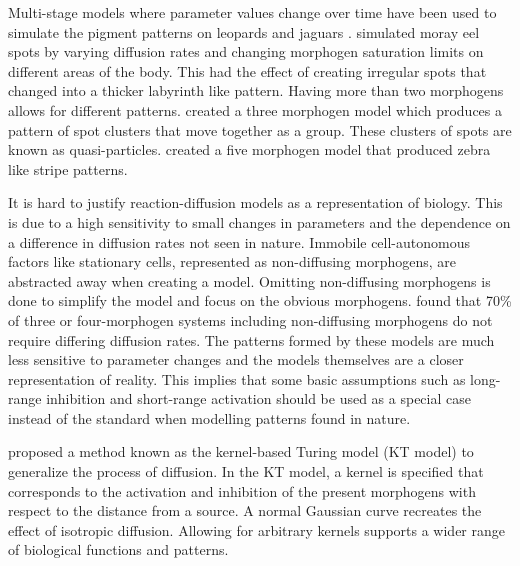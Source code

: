 Multi-stage models where parameter values change over time have been used to simulate the pigment patterns on leopards and jaguars \citep{liu2006}. \citet{malheiros2017} simulated moray eel spots by varying diffusion rates and changing morphogen saturation limits on different areas of the body. This had the effect of creating irregular spots that changed into a thicker labyrinth like pattern. Having more than two morphogens allows for different patterns. \citet{schenk2000} created a three morphogen model which produces a pattern of spot clusters that move together as a group. These clusters of spots are known as quasi-particles. \citet{meinhardt1982} created a five morphogen model that produced zebra like stripe patterns.

It is hard to justify reaction-diffusion models as a representation of biology. This is due to a high sensitivity to small changes in parameters and the dependence on a difference in diffusion rates not seen in nature. Immobile cell-autonomous factors like stationary cells, represented as non-diffusing morphogens, are abstracted away when creating a model. Omitting non-diffusing morphogens is done to simplify the model and focus on the obvious morphogens. \citet{marcon2016} found that 70\% of three or four-morphogen systems including non-diffusing morphogens do not require differing diffusion rates. The patterns formed by these models are much less sensitive to parameter changes and the models themselves are a closer representation of reality. This implies that some basic assumptions such as long-range inhibition and short-range activation should be used as a special case instead of the standard when modelling patterns found in nature.

\citet{kondo2017} proposed a method known as the kernel-based Turing model (KT model) to generalize the process of diffusion. In the KT model, a kernel is specified that corresponds to the activation and inhibition of the present morphogens with respect to the distance from a source. A normal Gaussian curve recreates the effect of isotropic diffusion. Allowing for arbitrary kernels supports a wider range of biological functions and patterns.